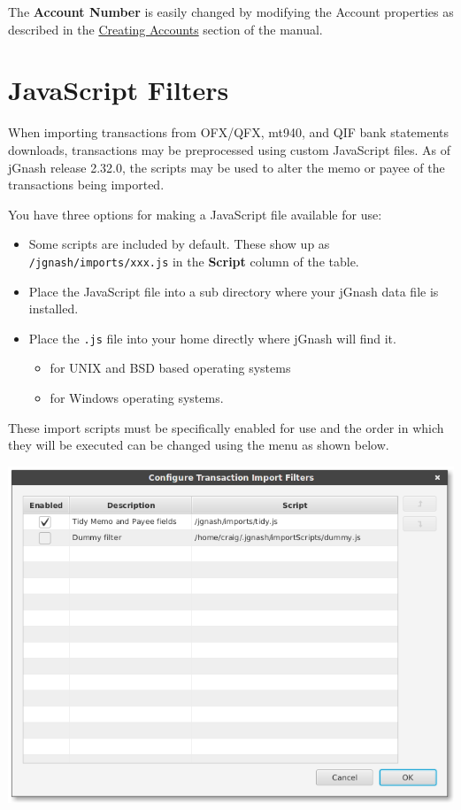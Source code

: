 \documentclass[letterpaper,12pt]{book}
\begin{document}
    The \textbf{Account Number} is easily changed by modifying the Account properties as described
    in the \hyperref[subsec:creatingAccounts]{Creating Accounts} section of the manual.

    \section{JavaScript Filters}
    When importing transactions from OFX/QFX, mt940, and QIF bank statements
    downloads, transactions may be preprocessed using custom JavaScript files. As
    of jGnash release 2.32.0, the scripts may be used to alter the memo or payee of
    the transactions being imported.

    You have three options for making a JavaScript file available for use:
    \begin{itemize}
        \item Some scripts are included by default. These show up as \texttt{/jgnash/imports/xxx.js}
        in the \textbf{Script} column of the table.
        \item Place the JavaScript file into a  sub directory where
        your jGnash data file is installed.
        \item Place the \texttt{.js} file into your home directly where jGnash will find it.
        \begin{itemize}
            \item {} for UNIX and BSD based operating systems
            \item {} for Windows operating systems.
        \end{itemize}
    \end{itemize}

    These import scripts must be specifically enabled for use and the order in which they will be executed can be changed
    using the  menu as shown below.

    \includegraphics[width=0.9\linewidth]{images/importFilters}
\end{document}
